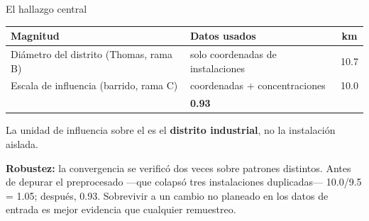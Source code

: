 \documentclass[11pt,aspectratio=169]{beamer}
\begin{document}
\begin{frame}{El hallazgo central}

\vspace{2mm}
\begin{center}
\small
\begin{tabular}{@{}p{4.3cm}p{4.4cm}c@{}}
\toprule
\textbf{Magnitud} & \textbf{Datos usados} & \textbf{km} \\
\midrule
Diámetro del distrito\newline
{\footnotesize (Thomas, rama B)} &
{\footnotesize solo coordenadas de instalaciones} & \num{10.7} \\[3mm]
Escala de influencia\newline
{\footnotesize (barrido, rama C)} &
{\footnotesize coordenadas + concentraciones} & \num{10.0} \\
\midrule
\rowcolor{grisc}
\multicolumn{2}{@{}l}{\textbf{Razón}} & {\color{rojo}\textbf{\num{0.93}}} \\
\bottomrule
\end{tabular}
\end{center}

\vspace{3mm}
\begin{block}{}
\centering\large
La unidad de influencia sobre el  es el \textbf{distrito industrial},
no la instalación aislada.
\end{block}

\vspace{1mm}
{\scriptsize\color{gris}\textbf{Robustez:} la convergencia se
verificó dos veces sobre patrones distintos. Antes de depurar el preprocesado
—que colapsó tres instalaciones duplicadas— \num{10.0}/\num{9.5} =
\num{1.05}; después, \num{0.93}. Sobrevivir a un cambio no planeado en los
datos de entrada es mejor evidencia que cualquier remuestreo.}

\end{frame}
\end{document}
